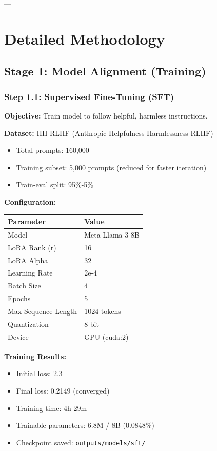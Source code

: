 \documentclass[11pt,a4paper]{article}
\begin{document}
---

\section{Detailed Methodology}

\subsection{Stage 1: Model Alignment (Training)}

\subsubsection{Step 1.1: Supervised Fine-Tuning (SFT)}

\textbf{Objective:} Train model to follow helpful, harmless instructions.

\textbf{Dataset:} HH-RLHF (Anthropic Helpfulness-Harmlessness RLHF)
\begin{itemize}
    \item Total prompts: 160,000
    \item Training subset: 5,000 prompts (reduced for faster iteration)
    \item Train-eval split: 95\%-5\%
\end{itemize}

\textbf{Configuration:}
\begin{table}[H]
\centering
\begin{tabular}{ll}
\toprule
\textbf{Parameter} & \textbf{Value} \\
\midrule
Model & Meta-Llama-3-8B \\
LoRA Rank (r) & 16 \\
LoRA Alpha & 32 \\
Learning Rate & 2e-4 \\
Batch Size & 4 \\
Epochs & 5 \\
Max Sequence Length & 1024 tokens \\
Quantization & 8-bit \\
Device & GPU (cuda:2) \\
\bottomrule
\end{tabular}
\end{table}

\textbf{Training Results:}
\begin{itemize}
    \item Initial loss: 2.3
    \item Final loss: 0.2149 (converged)
    \item Training time: 4h 29m
    \item Trainable parameters: 6.8M / 8B (0.0848\%)
    \item Checkpoint saved: \texttt{outputs/models/sft/}
\end{itemize}
\end{document}
